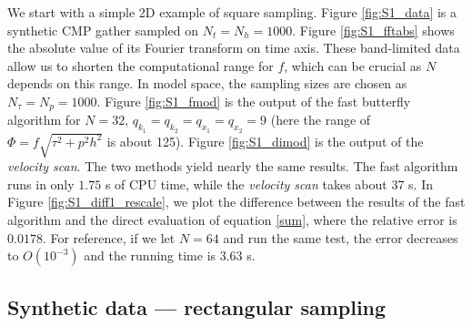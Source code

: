 We start with a simple 2D example of square sampling. Figure \ref{fig:S1_data} is a synthetic CMP gather sampled on $N_t=N_h=1000$. Figure \ref{fig:S1_fftabs} shows the absolute value of its Fourier transform on time axis. These band-limited data allow us to shorten the computational range for $f$, which can be crucial as $N$ depends on this range. In model space, the sampling sizes are chosen as $N_{\tau}=N_p=1000$. Figure \ref{fig:S1_fmod} is the output of the fast butterfly algorithm for $N=32$, $q_{k_1}=q_{k_2}=q_{x_1}=q_{x_2}=9$ (here the range of $\Phi=f\sqrt{\tau^2+p^2h^2}$ is about 125). Figure \ref{fig:S1_dimod} is the output of the {\it velocity scan}. The two methods yield nearly the same results. The fast algorithm runs in only $1.75$ s of CPU time, while the {\it velocity scan} takes about 37 s. In Figure \ref{fig:S1_diff1_rescale}, we plot the difference between the results of the fast algorithm and the direct evaluation of equation \ref{sum}, where the relative error is $0.0178$. For reference, if we let $N=64$ and run the same test, the error decreases to $O(10^{-3})$ and the running time is 3.63 s.









\subsection{Synthetic data --- rectangular sampling}

